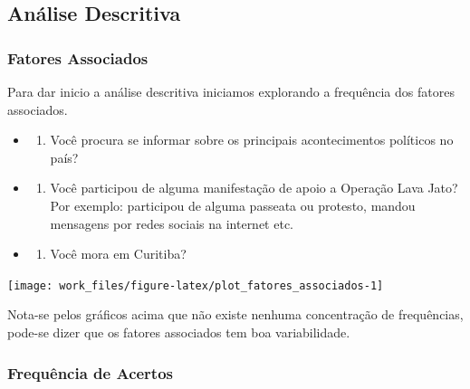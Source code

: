 \documentclass[]{article}
\providecommand{\tightlist}{%
  \setlength{\itemsep}{0pt}\setlength{\parskip}{0pt}}
\begin{document}
\subsection{Análise Descritiva}\label{analise-descritiva}

\subsubsection{Fatores Associados}\label{fatores-associados}

Para dar inicio a análise descritiva iniciamos explorando a frequência
dos fatores associados.

\begin{itemize}
\item
  \begin{enumerate}
  \def\labelenumi{\alph{enumi})}
  \tightlist
  \item
    Você procura se informar sobre os principais acontecimentos
    políticos no país?
  \end{enumerate}
\item
  \begin{enumerate}
  \def\labelenumi{\alph{enumi})}
  \setcounter{enumi}{1}
  \tightlist
  \item
    Você participou de alguma manifestação de apoio a Operação Lava
    Jato? Por exemplo: participou de alguma passeata ou protesto, mandou
    mensagens por redes sociais na internet etc.
  \end{enumerate}
\item
  \begin{enumerate}
  \def\labelenumi{\alph{enumi})}
  \setcounter{enumi}{2}
  \tightlist
  \item
    Você mora em Curitiba?
  \end{enumerate}
\end{itemize}

\begin{center}\texttt{[image: work\_files/figure-latex/plot\_fatores\_associados-1]} \end{center}

Nota-se pelos gráficos acima que não existe nenhuma concentração de
frequências, pode-se dizer que os fatores associados tem boa
variabilidade.

\subsubsection{Frequência de Acertos}\label{frequencia-de-acertos}
\end{document}
